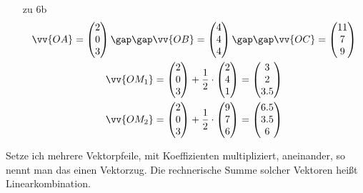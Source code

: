 \begin{itemize}
\begin{gather*}
  \end{gather*}
  \item [zu 6b]
  \begin{gather*}
    \vv{OA} = \begin{pmatrix}2 \\ 0 \\ 3\end{pmatrix} \gap\gap \vv{OB} = \begin{pmatrix}4 \\ 4 \\ 4\end{pmatrix} \gap\gap \vv{OC} = \begin{pmatrix}11 \\ 7 \\ 9\end{pmatrix} \\
    \vv{OM_1} = \begin{pmatrix}2 \\ 0 \\ 3\end{pmatrix} + \frac{1}{2} \cdot \begin{pmatrix}2 \\ 4 \\ 1\end{pmatrix} = \begin{pmatrix}3 \\ 2 \\ 3.5\end{pmatrix} \\
    \vv{OM_2} = \begin{pmatrix}2 \\ 0 \\ 3\end{pmatrix} + \frac{1}{2} \cdot \begin{pmatrix}9 \\ 7 \\ 6\end{pmatrix} = \begin{pmatrix}6.5 \\ 3.5 \\ 6\end{pmatrix}
  \end{gather*}
\end{itemize}
Setze ich mehrere Vektorpfeile, mit Koeffizienten multipliziert, aneinander, so nennt man das einen Vektorzug. Die rechnerische Summe solcher Vektoren heißt Linearkombination.
\newpage
